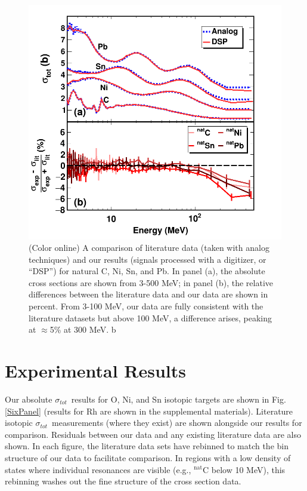 \documentclass[twocolumn,secnumarabic,amssymb, nobibnotes, aps, prl,
superscriptaddress, nobalancelastpage]{revtex4}
\newcommand{\tot}{\ensuremath{\sigma_{tot}}}
\begin{document}
\begin{figure}
    \includegraphics[width=\linewidth]{figures/literatureBenchmarking.png}
    \caption{(Color online) A comparison of literature data (taken with analog
    techniques) and our results (signals processed with a digitizer, or ``DSP'')
    for natural C, Ni, Sn, and Pb. In panel (a), the absolute cross sections are shown from
    3-500 MeV; in panel (b), the relative differences between the literature data and
    our data are shown in percent. From 3-100 MeV, our data are fully consistent with the
    literature datasets but above 100 MeV, a difference arises, peaking at
    $\approx$5\% at 300 MeV.
b}
    \label{LiteratureBenchmarking}
\end{figure}

\section{Experimental Results}
Our absolute \tot\ results for O, Ni, and Sn isotopic targets are shown in Fig.
\ref{SixPanel} (results for Rh are shown in the supplemental materials).
Literature isotopic \tot\ measurements
(where they exist) are shown alongside our results for comparison.
Residuals between our data and any existing literature data are also shown.
In each figure, the literature data sets have rebinned to match the bin
structure of our data to facilitate comparison. In regions with a low density of
states where individual resonances are visible (e.g., $^{\text{nat}}$C
below 10 MeV), this rebinning washes out the fine structure of the
cross section data.
\end{document}
